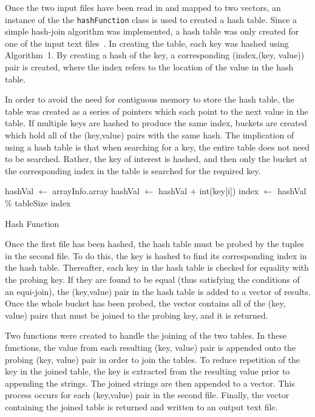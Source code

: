 \documentclass[12pt,twocolumn]{witseiepaper}
\begin{document}
Once the two input files have been read in and mapped to two vectors, an instance of the the \texttt{hashFunction} class is used to created a hash table. Since a simple hash-join algorithm was implemented, a hash table was only created for one of the input text files~\cite{evaluating4JoinAlgorithms}. In creating the table, each key was hashed using Algorithm~1. By creating a hash of the key, a corresponding (index,(key, value)) pair is created, where the index refers to the location of the value in the hash table. 

In order to avoid the need for contiguous memory to store the hash table, the table was created as a series of pointers which each point to the next value in the table. If multiple keys are hashed to produce the same index, buckets are created which hold all of the (key,value) pairs with the same hash. The implication of using a hash table is that when searching for a key, the entire table does not need to be searched. Rather, the key of interest is hashed, and then only the bucket at the corresponding index in the table is searched for the required key.
{
\begin{algorithm}[htbp]
	\begin{algorithmic}
		\State hashVal $\leftarrow$ arrayInfo.\textunderscore array
		\State hashVal $\leftarrow$ hashVal + int(key[i])
		\EndFor
		\State index $\leftarrow$ hashVal \% tableSize
		\State \Return index \\
		\EndFunction
		\caption{Hash Function}
		\label{alg:2}
	\end{algorithmic}
\end{algorithm}
}


Once the first file has been hashed, the hash table must be probed by the tuples in the second file. To do this, the key is hashed to find its corresponding index in the hash table. Thereafter, each key in the hash table is checked for equality with the probing key. If they are found to be equal (thus satisfying the conditions of an equi-join), the (key,value) pair in the hash table is added to a vector of results. Once the whole bucket has been probed, the vector contains all of the (key, value) pairs that must be joined to the probing key, and it is returned.

Two functions were created to handle the joining of the two tables. In these functions, the value from each resulting (key, value) pair is appended onto the probing (key, value) pair in order to join the tables. To reduce repetition of the key in the joined table, the key is extracted from the resulting value prior to appending the strings. The joined strings are then appended to a vector. This process occurs for each (key,value) pair in the second file. Finally, the vector containing the joined table is returned and written to an output text file.
\end{document}
